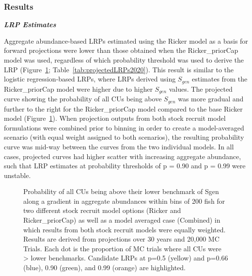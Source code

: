 \documentclass[11pt]{book}
\begin{document}
\hypertarget{results-2}{%
\subsubsection{Results}\label{results-2}}

\textbf{\emph{LRP Estimates}}

Aggregate abundance-based LRPs estimated using the Ricker model as a basis for forward projections were lower than those obtained when the Ricker\_priorCap model was used, regardless of which probability threshold was used to derive the LRP (Figure~\ref{fig:coho-projLRPCurveByOM}; Table~\ref{tab:projectedLRPs2020}). This result is similar to the logistic regression-based LRPs, where LRPs derived using \(S_{gen}\) estimates from the Ricker\_priorCap model were higher due to higher \(S_{gen}\) values. The projected curve showing the probability of all CUs being above \(S_{gen}\) was more gradual and further to the right for the Ricker\_priorCap model compared to the base Ricker model (Figure~\ref{fig:coho-projLRPCurveByOM}). When projection outputs from both stock recruit model formulations were combined prior to binning in order to create a model-averaged scenario (with equal weight assigned to both scenarios), the resulting probability curve was mid-way between the curves from the two individual models. In all cases, projected curves had higher scatter with increasing aggregate abundance, such that LRP estimates at probability thresholds of p = 0.90 and p = 0.99 were unstable.
\begin{figure}[htb]

{\centering {} 

}

\caption{Probability of all CUs being above their lower benchmark of Sgen along a gradient in aggregate abundances within bins of 200 fish for two different stock recruit model options (Ricker and Ricker\_priorCap) as well as a model averaged case (Combined) in which results from both stock recruit models were equally weighted. Results are derived from projections over 30 years and 20,000 MC Trials. Each dot is the proportion of MC trials where all CUs were > lower benchmarks. Candidate LRPs at p=0.5 (yellow) and p=0.66 (blue), 0.90 (green), and 0.99 (orange) are highlighted.}\label{fig:coho-projLRPCurveByOM}
\end{figure}
\end{document}
